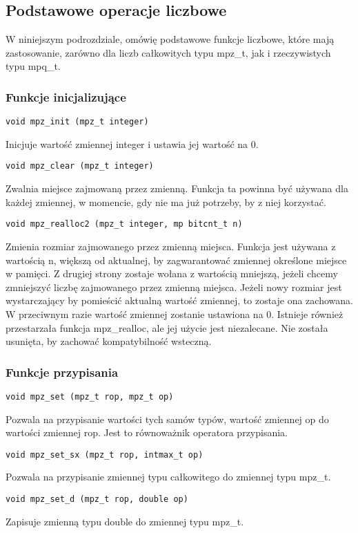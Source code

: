 \documentclass[twoside,a4paper]{book}
\begin{document}
\subsection{Podstawowe operacje liczbowe}
W niniejszym podrozdziale, omówię podstawowe funkcje liczbowe, które mają zastosowanie, zarówno dla liczb całkowitych typu mpz\_t, jak i rzeczywistych typu mpq\_t.

\subsubsection{Funkcje inicjalizujące}
\begin{lstlisting}
void mpz_init (mpz_t integer)
\end{lstlisting}
Inicjuje wartość zmiennej integer i ustawia jej wartość na 0.

\begin{lstlisting}
void mpz_clear (mpz_t integer)
\end{lstlisting}
Zwalnia miejsce zajmowaną przez zmienną. Funkcja ta powinna być używana dla każdej zmiennej, w momencie, gdy nie ma już potrzeby, by z niej korzystać.

\begin{lstlisting}
void mpz_realloc2 (mpz_t integer, mp bitcnt_t n)
\end{lstlisting}
Zmienia rozmiar zajmowanego przez zmienną miejsca. Funkcja jest używana z wartością n, większą od aktualnej, by zagwarantować zmiennej określone miejsce w pamięci. Z drugiej strony zostaje wołana z wartością mniejszą, jeżeli chcemy zmniejszyć liczbę zajmowanego przez zmienną miejsca. Jeżeli nowy rozmiar jest wystarczający by pomieścić aktualną wartość zmiennej, to zostaje ona zachowana. W przeciwnym razie wartość zmiennej zostanie ustawiona na 0. Istnieje również przestarzała funkcja mpz\_realloc, ale jej użycie jest niezalecane. Nie została usunięta, by zachować kompatybilność wsteczną.

\subsubsection{Funkcje przypisania}

\begin{lstlisting}
void mpz_set (mpz_t rop, mpz_t op)
\end{lstlisting}
Pozwala na przypisanie wartości tych samów typów, wartość zmiennej op do wartości zmiennej rop. Jest to równoważnik operatora przypisania.

\begin{lstlisting}
void mpz_set_sx (mpz_t rop, intmax_t op)
\end{lstlisting}
Pozwala na przypisanie zmiennej typu całkowitego do zmiennej typu mpz\_t.
\begin{lstlisting}
void mpz_set_d (mpz_t rop, double op)
\end{lstlisting}
Zapisuje zmienną typu double do zmiennej typu mpz\_t.
\end{document}

